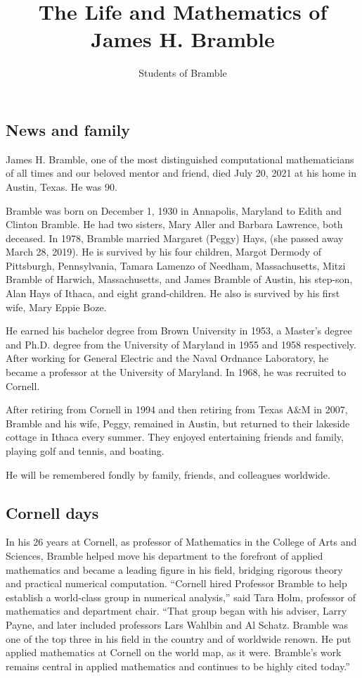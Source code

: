 \documentclass[CJK,11pt]{amsart}
\theoremstyle{definition}
\begin{document}
\begin{CJK*}{UTF8}{gbsn}
\title{
The Life and Mathematics of James H. Bramble
}
\author{Students of Bramble}
\maketitle

\section{News and family}
James H. Bramble, one of the most distinguished computational mathematicians of all times and our beloved mentor and friend, died July 20, 2021 at his home in Austin, Texas. He was 90.

Bramble was born on December 1, 1930 in Annapolis, Maryland to Edith and Clinton Bramble. He had two sisters, Mary Aller and Barbara Lawrence, both deceased. 
In 1978, Bramble married Margaret (Peggy) Hays, (she passed away March 28, 2019). 
He is survived by his four children, Margot Dermody of Pittsburgh, Pennsylvania, Tamara Lamenzo of Needham, Massachusetts, Mitzi Bramble of Harwich, Massachusetts, and James Bramble of Austin, his step-son, Alan Hays of Ithaca, and eight grand-children. He also is survived by his first wife, Mary Eppie Boze. 

{\color{red} He earned his bachelor degree from Brown University in
  1953, a Master's degree and Ph.D. degree from the University of
  Maryland in 1955 and 1958 respectively.  After working for General
  Electric and the Naval Ordnance Laboratory, he became a professor at
  the University of Maryland.  In 1968, he was recruited to Cornell.}

After retiring from Cornell in 1994 and then retiring from Texas A\&M
in 2007, Bramble and his wife, Peggy, remained in Austin, but returned
to their lakeside cottage in Ithaca every summer.  They enjoyed
entertaining friends and family, playing golf and tennis, and boating.

He will be remembered fondly by family, friends, and colleagues worldwide.

\subsection{Cornell days}
In his 26 years at Cornell, as professor of Mathematics in the College of Arts and Sciences,  Bramble helped move his department to the forefront of applied mathematics and became a leading figure in his field, bridging rigorous theory and practical numerical computation.  “Cornell hired Professor Bramble to help establish a world-class group in numerical analysis,” said Tara Holm, professor of mathematics and department chair. “That group began with his adviser, Larry Payne, and later included professors Lars Wahlbin and Al Schatz. Bramble was one of the top three in his field in the country and of worldwide renown. He put applied mathematics at Cornell on the world map, as it were. Bramble's work remains central in applied mathematics and continues to be highly cited today.”


\end{CJK*}
\end{document}
